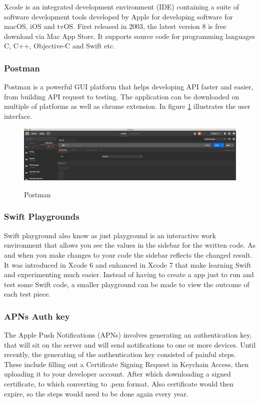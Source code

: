 Xcode is an integrated development environment (IDE) containing a suite of software development tools developed by Apple for developing software for macOS, iOS and tvOS. First released in 2003, the latest version 8 is free download via Mac App Store. It supports source code for programming languages C, C++, Objective-C and Swift etc. 

\subsubsection{Postman}

Postman is a powerful GUI platform that helps developing API faster and easier, from building API request to testing. The application can be downloaded on multiple of platforms as well as chrome extension. In figure \ref{fig:postman} illustrates the user interface. 

\begin{figure}[!h]
    \caption{Postman}
    \centering
    \includegraphics[width=150mm]{images/postman}
    \label{fig:postman}
\end{figure}


\subsubsection{Swift Playgrounds}

Swift playground also know as just playground is an interactive work environment that allows you see the values in the sidebar for the written code. As and when you make changes to your code the sidebar reflects the changed result. It was introduced in Xcode 6 and enhanced in Xcode 7 that make learning Swift and experimenting much easier. Instead of having to create a app just to run and test some Swift code, a smaller playground can be made to view the outcome of each test piece. 

\subsubsection{APNs Auth key}

The Apple Push Notifications (APNs) involves generating an authentication key, that will sit on the server and will send notifications to one or more devices. Until recently, the generating of the authentication key consisted of painful steps. These include filling out a Certificate Signing Request in Keychain Access, then uploading it to your developer account. After which downloading a signed certificate, to which converting to .pem format. Also certificate would then expire, so the steps would need to be done again every year.

